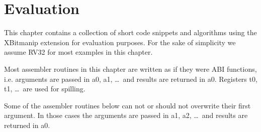 \chapter{Evaluation}

This chapter contains a collection of short code snippets and algorithms using
the XBitmanip extension for evaluation purposes. For the sake of simplicity we
assume RV32 for most examples in this chapter.

Most assembler routines in this chapter are written as if they were ABI functions,
i.e. arguments are passed in a0, a1, \dots\ and results are returned in a0. Registers
t0, t1, \dots\ are used for spilling.

Some of the assembler routines below can not or should not overwrite their
first argument. In those cases the arguments are passed in a1, a2, \dots\ and
results are returned in a0.

%
%
%
%
%
%
%
%
%
%

